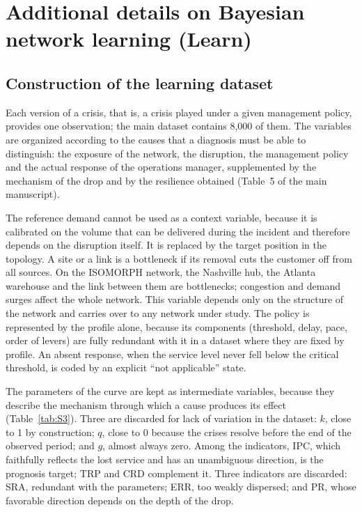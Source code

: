 \section{Additional details on Bayesian network learning (Learn)}
\label{sec:S5}

\subsection{Construction of the learning dataset}
\label{sec:S5.1}

Each version of a crisis, that is, a crisis played under a given management policy, provides one observation; the main dataset contains 8,000 of them. The variables are organized according to the causes that a diagnosis must be able to distinguish: the exposure of the network, the disruption, the management policy and the actual response of the operations manager, supplemented by the mechanism of the drop and by the resilience obtained (Table~5 of the main manuscript).

The reference demand cannot be used as a context variable, because it is calibrated on the volume that can be delivered during the incident and therefore depends on the disruption itself. It is replaced by the target position in the topology. A site or a link is a bottleneck if its removal cuts the customer off from all sources. On the ISOMORPH network, the Nashville hub, the Atlanta warehouse and the link between them are bottlenecks; congestion and demand surges affect the whole network. This variable depends only on the structure of the network and carries over to any network under study. The policy is represented by the profile alone, because its components (threshold, delay, pace, order of levers) are fully redundant with it in a dataset where they are fixed by profile. An absent response, when the service level never fell below the critical threshold, is coded by an explicit ``not applicable'' state.

The parameters of the curve are kept as intermediate variables, because they describe the mechanism through which a cause produces its effect (Table~\ref{tab:S3}). Three are discarded for lack of variation in the dataset: $k$, close to 1 by construction; $q$, close to 0 because the crises resolve before the end of the observed period; and $g$, almost always zero. Among the indicators, IPC, which faithfully reflects the lost service and has an unambiguous direction, is the prognosis target; TRP and CRD complement it. Three indicators are discarded: SRA, redundant with the parameters; ERR, too weakly dispersed; and PR, whose favorable direction depends on the depth of the drop.

